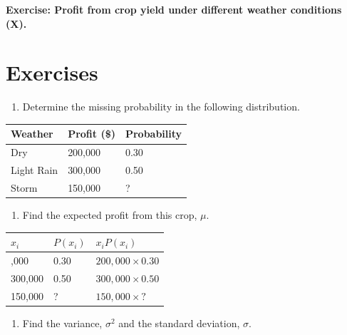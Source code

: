 \documentclass[
]{book}
\providecommand{\tightlist}{%
  \setlength{\itemsep}{0pt}\setlength{\parskip}{0pt}}
\begin{document}
\textbf{Exercise: Profit from crop yield under different weather conditions (X).}

\section{Exercises}\label{exercises}

\begin{enumerate}
\def\labelenumi{\arabic{enumi}.}
\tightlist
\item
  Determine the missing probability in the following distribution.
\end{enumerate}

\begin{longtable}[]{@{}lll@{}}
\toprule\noalign{}
Weather & Profit (\$) & Probability \\
\midrule\noalign{}
\endhead
\bottomrule\noalign{}
\endlastfoot
Dry & 200,000 & 0.30 \\
Light Rain & 300,000 & 0.50 \\
Storm & 150,000 & ? \\
\end{longtable}

\begin{enumerate}
\def\labelenumi{\arabic{enumi}.}
\setcounter{enumi}{1}
\tightlist
\item
  Find the expected profit from this crop, \(\mu\).
\end{enumerate}

\begin{longtable}[]{@{}lll@{}}
\toprule\noalign{}
\(x_i\) & \(P(x_i)\) & \(x_i P(x_i)\) \\
\midrule\noalign{}
\endhead
\bottomrule\noalign{}
\endlastfoot
200,000 & 0.30 & \(200,000 \times 0.30\) \\
300,000 & 0.50 & \(300,000 \times 0.50\) \\
150,000 & ? & \(150,000 \times ?\) \\
\end{longtable}

\begin{enumerate}
\def\labelenumi{\arabic{enumi}.}
\setcounter{enumi}{2}
\tightlist
\item
  Find the variance, \(\sigma^2\) and the standard deviation, \(\sigma\).
\end{enumerate}
\end{document}
